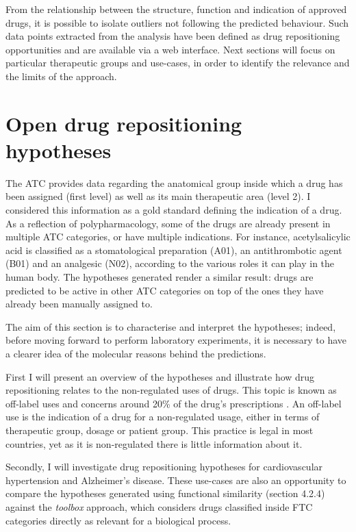 From the relationship between the structure, function and indication of approved drugs, it is possible to isolate outliers not following the predicted behaviour. Such data points extracted from the analysis have been defined as drug repositioning opportunities and are available via a web interface. Next sections will focus on particular therapeutic groups and use-cases, in order to identify the relevance and the limits of the approach.

\section{Open drug repositioning hypotheses}
The ATC provides data regarding the anatomical group inside which a drug has been assigned (first level) as well as its main therapeutic area (level 2). I considered this information as a gold standard defining the indication of a drug. As a reflection of polypharmacology, some of the drugs are already present in multiple ATC categories, or have multiple indications. For instance, acetylsalicylic acid is classified as a stomatological preparation (A01), an antithrombotic agent (B01) and an analgesic (N02), according to the various roles it can play in the human body. The hypotheses generated render a similar result: drugs are predicted to be active in other ATC categories on top of the ones they have already been manually assigned to.

The aim of this section is to characterise and interpret the hypotheses; indeed, before moving forward to perform laboratory experiments, it is necessary to have a clearer idea of the molecular reasons behind the predictions.

First I will present an overview of the hypotheses and illustrate how drug repositioning relates to the non-regulated uses of drugs. This topic is known as off-label uses \citep{offlabelwiki} and concerns around 20\% of the drug's prescriptions \citep{stafford2008regulating}. An off-label use is the indication of a drug for a non-regulated usage, either in terms of therapeutic group, dosage or patient group. This practice is legal in most countries, yet as it is non-regulated there is little information about it.

Secondly, I will investigate drug repositioning hypotheses for cardiovascular hypertension and Alzheimer's disease. These use-cases are also an opportunity to compare the hypotheses generated using functional similarity (section 4.2.4) against the \emph{toolbox} approach, which considers drugs classified inside FTC categories directly as relevant for a biological process.

